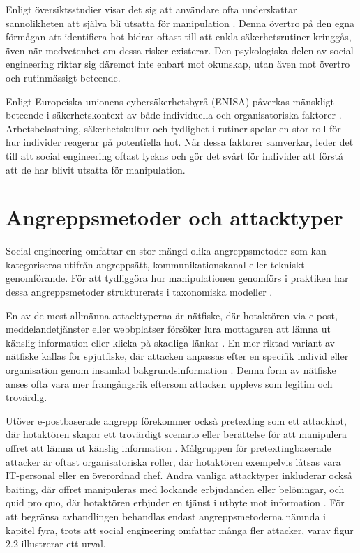 Enligt översiktsstudier visar det sig att användare ofta underskattar sannolikheten att själva bli utsatta för manipulation \cite{algarni2019se_survey}. Denna övertro på den egna förmågan att identifiera hot bidrar oftast 
till att enkla säkerhetsrutiner kringgås, även när medvetenhet om dessa risker existerar. Den psykologiska delen av social engineering riktar sig däremot inte enbart mot okunskap, utan även mot övertro och rutinmässigt beteende. 

Enligt Europeiska unionens cybersäkerhetsbyrå (ENISA) påverkas mänskligt beteende i säkerhetskontext av både individuella och organisatoriska faktorer \cite{enisa2018cybersecurity_culture}. Arbetsbelastning, säkerhetskultur 
och tydlighet i rutiner spelar en stor roll för hur individer reagerar på potentiella hot. När dessa faktorer samverkar, leder det till att social engineering oftast lyckas och gör det svårt för individer att förstå att de har 
blivit utsatta för manipulation. 

\section{Angreppsmetoder och attacktyper}
Social engineering omfattar en stor mängd olika angreppsmetoder som kan kategoriseras utifrån angreppsätt, kommunikationskanal eller tekniskt genomförande. För att tydliggöra hur manipulationen genomförs i praktiken har dessa 
angreppsmetoder strukturerats i taxonomiska modeller \cite{aldawood2019taxonomy, algarni2024comprehensive_taxonomy, gururaj2024social_engineering, krombholz2015overview}. 

En av de mest allmänna attacktyperna är nätfiske, där hotaktören via e-post, meddelandetjänster eller webbplatser försöker lura mottagaren att lämna ut känslig information eller klicka på skadliga 
länkar \cite{se_threat_defense_survey, algarni2019se_survey}. En mer riktad variant av nätfiske kallas för spjutfiske, där attacken anpassas efter en specifik individ eller organisation genom insamlad 
bakgrundsinformation \cite{heartfield_loukas_se}. Denna form av nätfiske anses ofta vara mer framgångsrik eftersom attacken upplevs som legitim och trovärdig.

Utöver e-postbaserade angrepp förekommer också pretexting som ett attackhot, där hotaktören skapar ett trovärdigt scenario eller berättelse för att manipulera offret att lämna ut känslig information \cite{mouton_se_systematic}. 
Målgruppen för pretextingbaserade attacker är oftast organisatoriska roller, där hotaktören exempelvis låtsas vara IT-personal eller en överordnad chef. Andra vanliga attacktyper inkluderar också baiting, där offret manipuleras 
med lockande erbjudanden eller belöningar, och quid pro quo, där hotaktören erbjuder en tjänst i utbyte mot information \cite{se_threat_defense_survey, algarni2019se_survey}. För att begränsa avhandlingen behandlas endast angreppsmetoderna nämnda i kapitel fyra, trots
att social engineering omfattar många fler attacker, varav figur 2.2 illustrerar ett urval.
 

